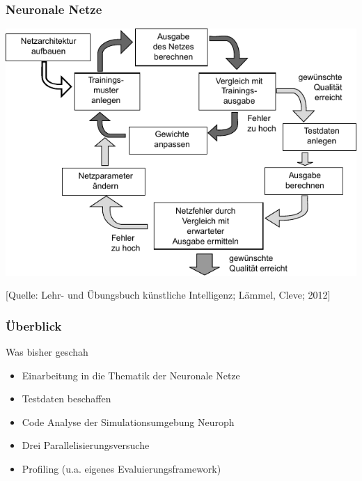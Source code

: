 \documentclass[18pt]{beamer}
\begin{document}
	\begin{frame}[c]\frametitle{Neuronale Netze}
		\begin{center}
		\includegraphics[scale=.8]{images/workflow}
		\end{center}
		\begin{flushright}
		\tiny{[Quelle: Lehr- und Übungsbuch künstliche Intelligenz; Lämmel, Cleve; 2012]}
		\end{flushright}
	\end{frame}		

	\begin{frame}[c]\frametitle{Überblick}
		\begin{block}{Was bisher geschah}
		    \begin{itemize}
		    	\item Einarbeitung in die Thematik der Neuronale Netze
			    \item Testdaten beschaffen
		    	\item Code Analyse der Simulationsumgebung Neuroph
		    	\item Drei Parallelisierungsversuche
		    	\item Profiling (u.a. eigenes Evaluierungsframework)
		    \end{itemize}		    
		\end{block}
	\end{frame}
	
\end{document}
